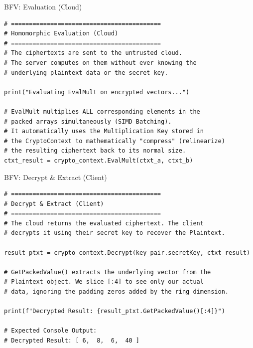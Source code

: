 \documentclass[aspectratio=169, 10pt]{beamer}
\begin{document}
\begin{frame}[fragile]{BFV: Evaluation (Cloud)}
\vspace{0.1cm}
\begin{lstlisting}[firstnumber=29]
# ==========================================
# Homomorphic Evaluation (Cloud)
# ==========================================
# The ciphertexts are sent to the untrusted cloud. 
# The server computes on them without ever knowing the 
# underlying plaintext data or the secret key.

print("Evaluating EvalMult on encrypted vectors...")

# EvalMult multiplies ALL corresponding elements in the 
# packed arrays simultaneously (SIMD Batching). 
# It automatically uses the Multiplication Key stored in 
# the CryptoContext to mathematically "compress" (relinearize) 
# the resulting ciphertext back to its normal size.
ctxt_result = crypto_context.EvalMult(ctxt_a, ctxt_b)
\end{lstlisting}
\end{frame}

\begin{frame}[fragile]{BFV: Decrypt \& Extract (Client)}
\vspace{0.1cm}
\begin{lstlisting}[firstnumber=38]
# ==========================================
# Decrypt & Extract (Client)
# ==========================================
# The cloud returns the evaluated ciphertext. The client 
# decrypts it using their secret key to recover the Plaintext.

result_ptxt = crypto_context.Decrypt(key_pair.secretKey, ctxt_result)

# GetPackedValue() extracts the underlying vector from the 
# Plaintext object. We slice [:4] to see only our actual 
# data, ignoring the padding zeros added by the ring dimension.

print(f"Decrypted Result: {result_ptxt.GetPackedValue()[:4]}")

# Expected Console Output:
# Decrypted Result: [ 6,  8,  6,  40 ]
\end{lstlisting}
\end{frame}
\end{document}
